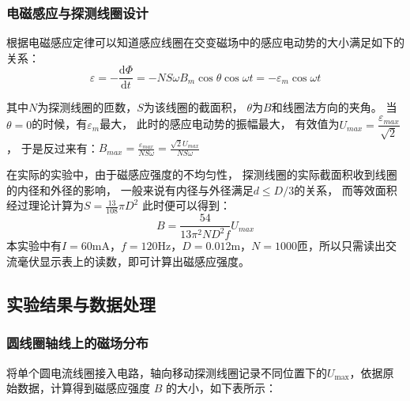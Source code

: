 \documentclass[11pt]{article}
\begin{document}
	\subsubsection{电磁感应与探测线圈设计}
	根据电磁感应定律可以知道感应线圈在交变磁场中的感应电动势的大小满足如下的关系：
	\begin{equation*}
		\varepsilon=-\frac{\mathrm{d}\Phi}{\mathrm{d}t}=-NS\omega B_m\cos\theta\cos\omega t=-\varepsilon_m\cos\omega t
	\end{equation*}
	
	其中$N$为探测线圈的匝数，$S$为该线圈的截面积，
	$\theta$为$B$和线圈法方向的夹角。
	当$\theta=0$的时候，有$\varepsilon_m$最大，
	此时的感应电动势的振幅最大，
	有效值为$U_{max}=\dfrac{\varepsilon_{max}}{\sqrt{2}}$，
	于是反过来有：$B_{max}=\frac{\varepsilon_{max}}{NS\omega}=\frac{\sqrt{2}U_{max}}{NS\omega}$
	
	在实际的实验中，由于磁感应强度的不均匀性，
	探测线圈的实际截面积收到线圈的内径和外径的影响，
	一般来说有内径与外径满足$d\leq D/3$的关系，
	而等效面积经过理论计算为$S=\frac{13}{108}\pi D^2$
	此时便可以得到：
	\begin{equation*}
		B=\frac{54}{13\pi^2ND^2f}U_{max}
	\end{equation*}
	本实验中有$I=60$mA，$f=120$Hz，$D=0.012$m，$N=1000$匝，所以只需读出交流毫伏显示表上的读数，即可计算出磁感应强度。
	
	\subsection{实验结果与数据处理}
	\subsubsection{圆线圈轴线上的磁场分布}
	将单个圆电流线圈接入电路，轴向移动探测线圈记录不同位置下的$ U_{\max} $，依据原始数据，计算得到磁感应强度 $B$ 的大小，如下表所示：
	
\end{document}
